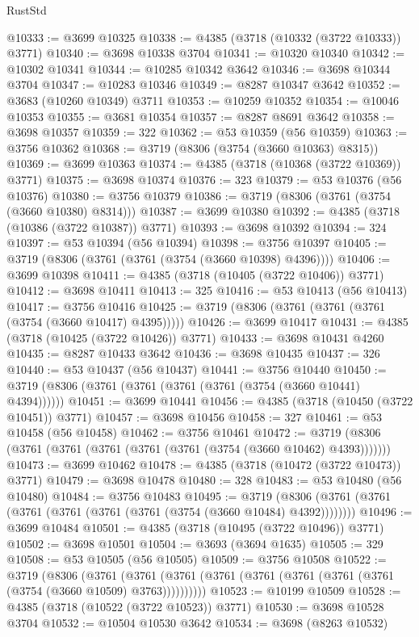\begin{lexlean}{RustStd}
\begin{coremodule}
@10333 := @3699 @10325
@10338 := @4385 (@3718 (@10332 (@3722 @10333)) @3771)
@10340 := @3698 @10338 @3704
@10341 := @10320 @10340
@10342 := @10302 @10341
@10344 := @10285 @10342 @3642
@10346 := @3698 @10344 @3704
@10347 := @10283 @10346
@10349 := @8287 @10347 @3642
@10352 := @3683 (@10260 @10349) @3711
@10353 := @10259 @10352
@10354 := @10046 @10353
@10355 := @3681 @10354
@10357 := @8287 @8691 @3642
@10358 := @3698 @10357
@10359 := 322
@10362 := @53 @10359 (@56 @10359)
@10363 := @3756 @10362
@10368 := @3719 (@8306 (@3754 (@3660 @10363) @8315))
@10369 := @3699 @10363
@10374 := @4385 (@3718 (@10368 (@3722 @10369)) @3771)
@10375 := @3698 @10374
@10376 := 323
@10379 := @53 @10376 (@56 @10376)
@10380 := @3756 @10379
@10386 := @3719 (@8306 (@3761 (@3754 (@3660 @10380) @8314)))
@10387 := @3699 @10380
@10392 := @4385 (@3718 (@10386 (@3722 @10387)) @3771)
@10393 := @3698 @10392
@10394 := 324
@10397 := @53 @10394 (@56 @10394)
@10398 := @3756 @10397
@10405 := @3719 (@8306 (@3761 (@3761 (@3754 (@3660 @10398) @4396))))
@10406 := @3699 @10398
@10411 := @4385 (@3718 (@10405 (@3722 @10406)) @3771)
@10412 := @3698 @10411
@10413 := 325
@10416 := @53 @10413 (@56 @10413)
@10417 := @3756 @10416
@10425 := @3719 (@8306 (@3761 (@3761 (@3761 (@3754 (@3660 @10417) @4395)))))
@10426 := @3699 @10417
@10431 := @4385 (@3718 (@10425 (@3722 @10426)) @3771)
@10433 := @3698 @10431 @4260
@10435 := @8287 @10433 @3642
@10436 := @3698 @10435
@10437 := 326
@10440 := @53 @10437 (@56 @10437)
@10441 := @3756 @10440
@10450 := @3719 (@8306 (@3761 (@3761 (@3761 (@3761 (@3754 (@3660 @10441) @4394))))))
@10451 := @3699 @10441
@10456 := @4385 (@3718 (@10450 (@3722 @10451)) @3771)
@10457 := @3698 @10456
@10458 := 327
@10461 := @53 @10458 (@56 @10458)
@10462 := @3756 @10461
@10472 := @3719 (@8306 (@3761 (@3761 (@3761 (@3761 (@3761 (@3754 (@3660 @10462) @4393)))))))
@10473 := @3699 @10462
@10478 := @4385 (@3718 (@10472 (@3722 @10473)) @3771)
@10479 := @3698 @10478
@10480 := 328
@10483 := @53 @10480 (@56 @10480)
@10484 := @3756 @10483
@10495 := @3719 (@8306 (@3761 (@3761 (@3761 (@3761 (@3761 (@3761 (@3754 (@3660 @10484) @4392))))))))
@10496 := @3699 @10484
@10501 := @4385 (@3718 (@10495 (@3722 @10496)) @3771)
@10502 := @3698 @10501
@10504 := @3693 (@3694 @1635)
@10505 := 329
@10508 := @53 @10505 (@56 @10505)
@10509 := @3756 @10508
@10522 := @3719
    (@8306
      (@3761 (@3761 (@3761 (@3761 (@3761 (@3761 (@3761 (@3761 (@3754 (@3660 @10509) @3763))))))))))
@10523 := @10199 @10509
@10528 := @4385 (@3718 (@10522 (@3722 @10523)) @3771)
@10530 := @3698 @10528 @3704
@10532 := @10504 @10530 @3642
@10534 := @3698 (@8263 @10532)

\end{coremodule}
\end{lexlean}
